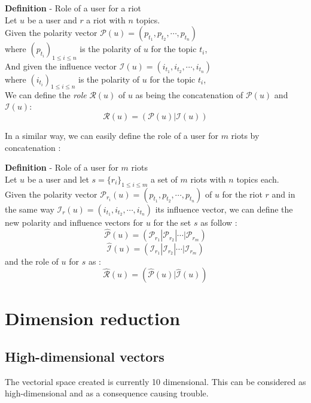 \documentclass[a4paper,twoside,12pt,openright]{report}
\begin{document}
\begin{defbox}
\textbf{Definition} - Role of a user for a riot \\[10pt]
Let $u$ be a user and $r$ a riot with $n$ topics. \\
Given the polarity vector $ \mathcal{P}(u) = (p_{t_1},p_{t_2},\cdots,p_{t_n}) $\\ \hspace*{20pt} where $(p_{t_i})_{1\leq i\leq n}$ is the polarity of $u$ for the topic $t_i$,\\
And given the influence vector $ \mathcal{I}(u) = (i_{t_1},i_{t_2},\cdots,i_{t_n}) $\\ \hspace*{20pt} where $(i_{t_i})_{1\leq i\leq n}$ is the polarity of $u$ for the topic $t_i$,\\[10pt]
We can define the \emph{role} $ \mathcal{R}(u) $ of $u$ as being the concatenation of $\mathcal{P}(u)$ and $\mathcal{I}(u) : $
$$ \mathcal{R}(u) = (\mathcal{P}(u) | \mathcal{I}(u)) $$
\end{defbox}

\newpage

In a similar way, we can easily define the role of a user for $m$ riots by concatenation : 

\begin{defbox}
\textbf{Definition} - Role of a user for $m$ riots \\[10pt]
Let $u$ be a user and let $s = \{r_i\}_{1\leq i\leq m}$ a set of $m$ riots with $n$ topics each. \\
Given the polarity vector $ \mathcal{P}_{r_i}(u) = (p_{t_1},p_{t_2},\cdots,p_{t_n}) $ of $u$ for the riot $r$ and in the same way $ \mathcal{I}_r(u) = (i_{t_1},i_{t_2},\cdots,i_{t_n}) $ its influence vector, we can define the new polarity and influence vectors for $u$ for the set $s$ as follow : 
$$ \mathcal{\hat{P}}(u) = (\mathcal{P}_{r_1}|\mathcal{P}_{r_2}|\cdots|\mathcal{P}_{r_m}) $$
$$ \mathcal{\hat{I}}(u) = (\mathcal{I}_{r_1}|\mathcal{I}_{r_2}|\cdots|\mathcal{I}_{r_m}) $$
and the role of $u$ for $s$ as : 
$$ \mathcal{\hat{R}}(u) = (\mathcal{\hat{P}}(u) | \mathcal{\hat{I}}(u)) $$
\end{defbox}

\section{Dimension reduction}
\label{dimReducSection}

\subsection{High-dimensional vectors}
The vectorial space created is currently 10 dimensional. This can be considered as high-dimensional and as a consequence causing trouble. 
\end{document}
